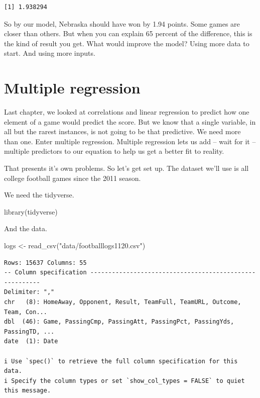 \documentclass[
  letterpaper,
  DIV=11,
  numbers=noendperiod]{scrreprt}
\newenvironment{Shaded}{\begin{snugshade}}{\end{snugshade}}
\newcommand{\FunctionTok}[1]{\textcolor[rgb]{0.28,0.35,0.67}{#1}}
\newcommand{\NormalTok}[1]{\textcolor[rgb]{0.00,0.23,0.31}{#1}}
\newcommand{\OtherTok}[1]{\textcolor[rgb]{0.00,0.23,0.31}{#1}}
\newcommand{\StringTok}[1]{\textcolor[rgb]{0.13,0.47,0.30}{#1}}
\begin{document}
\begin{verbatim}
[1] 1.938294
\end{verbatim}

So by our model, Nebraska should have won by 1.94 points. Some games are
closer than others. But when you can explain 65 percent of the
difference, this is the kind of result you get. What would improve the
model? Using more data to start. And using more inputs.


\hypertarget{multiple-regression}{%
\chapter{Multiple regression}\label{multiple-regression}}

Last chapter, we looked at correlations and linear regression to predict
how one element of a game would predict the score. But we know that a
single variable, in all but the rarest instances, is not going to be
that predictive. We need more than one. Enter multiple regression.
Multiple regression lets us add -- wait for it -- multiple predictors to
our equation to help us get a better fit to reality.

That presents it's own problems. So let's get set up. The dataset we'll
use is all college football games since the 2011 season.

We need the tidyverse.

\begin{Shaded}
\begin{Highlighting}[]
\FunctionTok{library}\NormalTok{(tidyverse)}
\end{Highlighting}
\end{Shaded}

And the data.

\begin{Shaded}
\begin{Highlighting}[]
\NormalTok{logs }\OtherTok{\textless{}{-}} \FunctionTok{read\_csv}\NormalTok{(}\StringTok{"data/footballlogs1120.csv"}\NormalTok{)}
\end{Highlighting}
\end{Shaded}

\begin{verbatim}
Rows: 15637 Columns: 55
-- Column specification --------------------------------------------------------
Delimiter: ","
chr   (8): HomeAway, Opponent, Result, TeamFull, TeamURL, Outcome, Team, Con...
dbl  (46): Game, PassingCmp, PassingAtt, PassingPct, PassingYds, PassingTD, ...
date  (1): Date

i Use `spec()` to retrieve the full column specification for this data.
i Specify the column types or set `show_col_types = FALSE` to quiet this message.
\end{verbatim}
\end{document}
